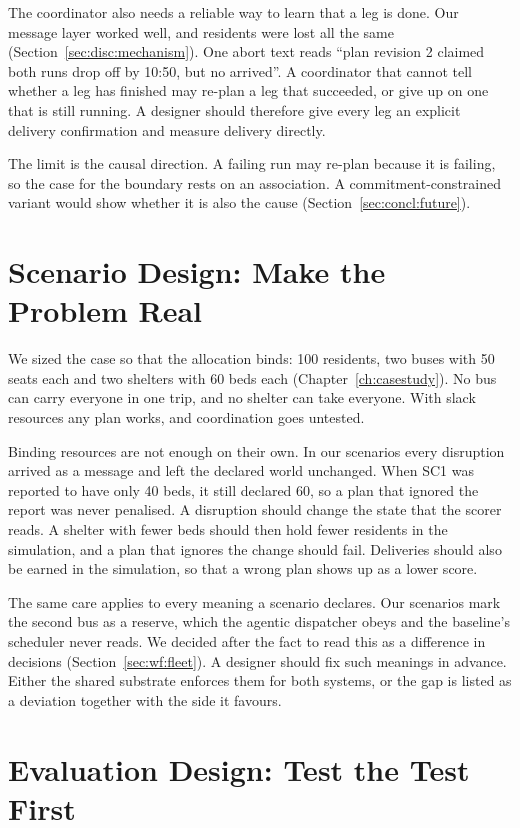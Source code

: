 The coordinator also needs a reliable way to learn that a leg is done. Our
message layer worked well, and residents were lost all the same
(Section~\ref{sec:disc:mechanism}). One abort text reads ``plan revision 2
claimed both runs drop off by 10:50, but no 
arrived''. A coordinator that cannot tell whether a leg has finished may
re-plan a leg that succeeded, or give up on one that is still running. A
designer should therefore give every
leg an explicit delivery confirmation and measure delivery directly.

The limit is the causal direction. A failing run may re-plan because it is
failing, so the case for the boundary rests on an association. A
commitment-constrained variant would show whether it is also the cause
(Section~\ref{sec:concl:future}).

\section{Scenario Design: Make the Problem Real}
\label{sec:design:binding}
\label{sec:design:reserve}

We sized the case so that the allocation binds: 100 residents, two buses with 50 seats each and two
shelters with 60 beds each (Chapter~\ref{ch:casestudy}). No bus can carry
everyone in one trip, and no shelter can take everyone. With slack resources
any plan works, and coordination goes untested.

Binding resources are not enough on their own. In our scenarios every
disruption arrived as a message and left the declared world unchanged. When
SC1 was reported to have only 40 beds, it still declared 60, so a plan that
ignored the report was never penalised. A disruption should change the state
that the scorer reads. A shelter with fewer beds should then hold fewer
residents in the simulation, and a plan that ignores the change should fail.
Deliveries should also be earned in the simulation, so that a wrong plan shows
up as a lower score.

The same care applies to every meaning a scenario declares. Our scenarios
mark the second bus as a reserve, which the agentic dispatcher obeys and the
baseline's scheduler never reads. We decided after the fact to read this as a
difference in decisions (Section~\ref{sec:wf:fleet}). A designer should fix
such meanings in advance. Either the shared substrate enforces them for both systems, or the
gap is listed as a deviation together with the side it favours.

\section{Evaluation Design: Test the Test First}
\label{sec:design:gate0}
\label{sec:design:variance}

